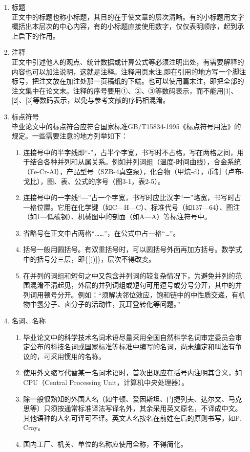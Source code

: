 \documentclass{HDU-Bachelor-Thesis}
\begin{document}
\begin{enumerate}

    \item 标题\\
    正文中的标题也称小标题，其目的在于使文章的层次清晰。有的小标题用文字概括出本层次的中心内容，有的小标题直接使用数字，仅仅表明顺序，起到承上启下的作用。

    \item 注释\\
    正文中引述他人的观点、统计数据或计算公式等必须注明出处，有需要解释的内容也可以加注说明，这就是注释。注释用页末注,即在引用的地方写一个脚注标号，把注文放在加注处那一页稿纸的下端。也可以使用篇末注，即把全部的注文集中在论文末。注释的序号要用①、②、③等数码表示，而不能用[1]、[2]、[3]等数码表示，以免与参考文献的序码相混淆。

    \item 标点符号\\
    毕业论文中的标点符合应符合国家标准GB/T15834-1995《标点符号用法》\cite{gbt15834-1995}的规定。一些需要注意的地方列举如下：
    \begin{enumerate}
        \item 连接号中的半字线即“-”，占半个字宽，书写时不占格，写在两格之间，用于结合各种并列和从属关系。例如并列词组（温度-时间曲线），合金系统（Fe-Cr-Al），产品型号（SZB-4真空泵），化合物（甲烷-d），币制（卢布-戈比），图、表、公式的序号（图3-1，表2-5）。
        \item 连接号中的一字线“—”占一个字宽，书写时应比汉字“一”略宽，书写时占一格位置。它用在化学键（如C—H—C）、标准代号（如137—64）、图注（如1—低碳钢）、机械图中的剖面（如A—A）等标注符号中。
        \item 省略号在正文中占两格“……”，在公式中占一格“…”。
        \item 括号一般用圆括号。有双重括号时，可以圆括号外面再加方括号。数学式中的括号分三层，即\{[()]\}，层次不得改变。
        \item 在并列的词组和短句之中又包含并列词的较复杂情况下，为避免并列的范围混淆不清起见，外层的并列词组或短句可用逗号或分号分开，其中的并列词用顿号分开。例如：“须解决邻位效应，饱和链中的中性质交递，有机物中氢分子、卤分子的活动性，瓦耳登转化等问题。”
    \end{enumerate}

    \item 名词、名称
    \begin{enumerate}
        \item 毕业论文中的科学技术名词术语尽量采用全国自然科学名词审定委员会审定公布的科技名词或国家标准等标准中编写的名词，尚未编定和叫法有争议的，可采用惯用的名称。
        \item 使用外文缩写代替某一名词术语时，首次出现应在括号内注明其含义，如CPU（Central Processing Unit，计算机中央处理器）。
        \item 除一般很熟知的外国人名（如牛顿、爱因斯坦、门捷列夫、达尔文、马克思等）只须按通常标准译法写译名外，其余采用英文原名，不译成中文。其他语种的人名可译可不译。英文人名按名在前姓在后的原则书写，如P. Cray。
        \item 国内工厂、机关、单位的名称应使用全称，不得简化。
    \end{enumerate}


\end{enumerate}
\end{document}
